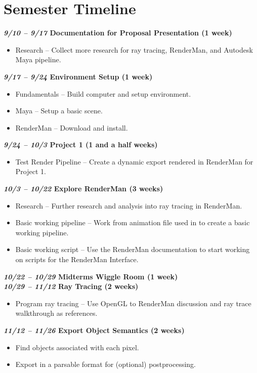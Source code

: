 \documentclass[conference]{IEEEtran}
\begin{document}
\section{Semester Timeline}
\label{subsec:semester_timeline}
\textbf{\textit{9/10 -- 9/17} Documentation for Proposal Presentation (1 week)}
\begin{itemize}
\item Research -- Collect more research for ray tracing, RenderMan, and Autodesk Maya pipeline.
\end{itemize}
\textbf{\textit{9/17 -- 9/24} Environment Setup (1 week)}
\begin{itemize}
\item Fundamentals -- Build computer and setup environment.
\item Maya -- Setup a basic scene.
\item RenderMan -- Download and install.
\end{itemize}
\textbf{\textit{9/24 -- 10/3} Project 1 (1 and a half weeks)}
\begin{itemize}
\item Test Render Pipeline -- Create a dynamic export rendered in RenderMan for Project 1.
\end{itemize}
\textbf{\textit{10/3 -- 10/22} Explore RenderMan (3 weeks)}
\begin{itemize}
\item Research -- Further research and analysis into ray tracing in RenderMan.
\item Basic working pipeline -- Work from animation file used in \cite{thesis_harris}
to create a basic working pipeline.
\item Basic working script -- Use the RenderMan documentation \cite{renderman_docs}
to start working on scripts for the RenderMan Interface.
\end{itemize}
\textbf{\textit{10/22 -- 10/29} Midterms Wiggle Room (1 week)}\\
\textbf{\textit{10/29 -- 11/12} Ray Tracing (2 weeks)}
\begin{itemize}
\item Program ray tracing -- Use OpenGL to RenderMan discussion \cite{renderman_opengl}
and ray trace walkthrough \cite{raytrace_walkthrough} as references.
\end{itemize}
\textbf{\textit{11/12 -- 11/26} Export Object Semantics (2 weeks)}
\begin{itemize}
\item Find objects associated with each pixel.
\item Export in a parsable format for (optional) postprocessing.
\end{itemize}
\end{document}
